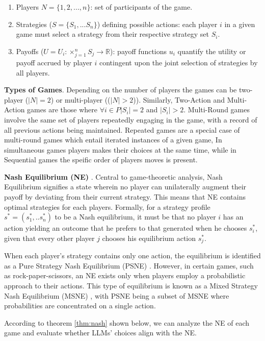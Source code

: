 \documentclass{article}
\begin{document}
\begin{enumerate}
    \item Players $N = \{1, 2, ..., n\}$: set of participants of the game.
    \item Strategies ($S = \{S_1,...S_n\}$) defining possible actions: each player $i$ in a given game must select a strategy from their respective strategy set $S_i$.
    \item Payoffs ($U={U_i: \times_{j=1}^{n} S_j \rightarrow \mathbb{R}}$): payoff functions $u_i$ quantify the utility or payoff accrued by player $i$ contingent upon the joint selection of strategies by all players.
\end{enumerate}

\textbf{Types of Games}. Depending on the number of players the games can be two-player ($|N|=2$) or multi-player (($|N|>2$)). Similarly, Two-Action and Multi-Action games are those where $\forall i \in P |S_i| = 2$ and $|S_i| > 2$. Multi-Round games involve the same set of players repeatedly engaging in the game, with a record of all previous actions being maintained. Repeated games are a special case of multi-round games which entail iterated instances of a given game, In simultaneous games players makes their choices at the same time, while in Sequential games the speific order of players moves is present.

\textbf{Nash Equilibrium (NE)} \cite{nash1950equilibrium}. Central to game-theoretic analysis, Nash Equilibrium signifies a state wherein no player can unilaterally augment their payoff by deviating from their current strategy. This means that NE contains optimal strategies for each players. Formally, for a strategy profile $s^* = (s^*_1,..s^*_n)$ to be a Nash equilibrium, it must be that no player $i$ has an action yielding an outcome that he prefers to that generated when he chooses $s_i^*$, given that every other player $j$ chooses his equilibrium action $s_j^*$.

When each player’s strategy contains only one action, the equilibrium is identified as a Pure Strategy Nash Equilibrium (PSNE) \cite{nash1950equilibrium}. However, in certain games, such as rock-paper-scissors, an NE exists only when players employ a probabilistic approach to their actions. This type of equilibrium is known as a Mixed Strategy Nash Equilibrium (MSNE) \cite{nash1950non}, with PSNE being a subset of MSNE where probabilities are concentrated on a single action.

According to theorem \ref{thm:nash} shown below, we can analyze the NE of each game and evaluate whether LLMs’ choices align with the NE.
\end{document}
